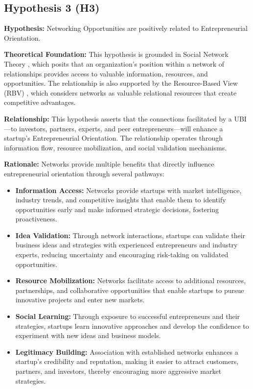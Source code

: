 \documentclass[../Main.tex]{subfiles}
\begin{document}
    \subsection{Hypothesis 3 (H3)}
    \textbf{Hypothesis:} Networking Opportunities are positively related to Entrepreneurial Orientation.
    
    \textbf{Theoretical Foundation:} This hypothesis is grounded in Social Network Theory \cite{granovetter1973strength}, which posits that an organization's position within a network of relationships provides access to valuable information, resources, and opportunities. The relationship is also supported by the Resource-Based View (RBV) \cite{barney1991firm}, which considers networks as valuable relational resources that create competitive advantages.
    
    \textbf{Relationship:} This hypothesis asserts that the connections facilitated by a UBI—to investors, partners, experts, and peer entrepreneurs—will enhance a startup's Entrepreneurial Orientation. The relationship operates through information flow, resource mobilization, and social validation mechanisms.
    
    \textbf{Rationale:} Networks provide multiple benefits that directly influence entrepreneurial orientation through several pathways:
    \begin{itemize}
        \item \textbf{Information Access:} Networks provide startups with market intelligence, industry trends, and competitive insights that enable them to identify opportunities early and make informed strategic decisions, fostering proactiveness.
        \item \textbf{Idea Validation:} Through network interactions, startups can validate their business ideas and strategies with experienced entrepreneurs and industry experts, reducing uncertainty and encouraging risk-taking on validated opportunities.
        \item \textbf{Resource Mobilization:} Networks facilitate access to additional resources, partnerships, and collaborative opportunities that enable startups to pursue innovative projects and enter new markets.
        \item \textbf{Social Learning:} Through exposure to successful entrepreneurs and their strategies, startups learn innovative approaches and develop the confidence to experiment with new ideas and business models.
        \item \textbf{Legitimacy Building:} Association with established networks enhances a startup's credibility and reputation, making it easier to attract customers, partners, and investors, thereby encouraging more aggressive market strategies.
    \end{itemize}
    
\end{document}
